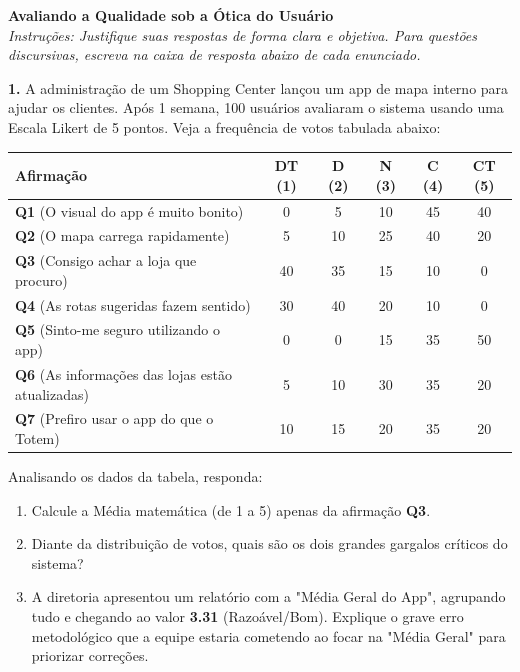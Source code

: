 \documentclass[12pt]{article}
\begin{document}

\vspace*{0.2cm}

\begin{center}
  {\Large \textbf{Avaliando a Qualidade sob a Ótica do Usuário}}\\[0.2cm]
  \textit{Instruções: Justifique suas respostas de forma clara e objetiva.
  Para questões discursivas, escreva na caixa de resposta abaixo de cada enunciado.}
\end{center}

\vspace{0.4cm}

\textbf{1.} A administração de um Shopping Center lançou um app de mapa interno para ajudar os clientes. Após 1 semana, 100 usuários avaliaram o sistema usando uma Escala Likert de 5 pontos. Veja a frequência de votos tabulada abaixo:

\vspace{0.3cm}
\begin{center}
    \renewcommand{\arraystretch}{1.2}
    \begin{tabular}{l | c | c | c | c | c}
        \hline
        \textbf{Afirmação} & \textbf{DT (1)} & \textbf{D (2)} & \textbf{N (3)} & \textbf{C (4)} & \textbf{CT (5)} \\
        \hline
        \textbf{Q1} (O visual do app é muito bonito) & 0 & 5 & 10 & 45 & 40 \\
        \textbf{Q2} (O mapa carrega rapidamente) & 5 & 10 & 25 & 40 & 20 \\
        \textbf{Q3} (Consigo achar a loja que procuro) & 40 & 35 & 15 & 10 & 0 \\
        \textbf{Q4} (As rotas sugeridas fazem sentido) & 30 & 40 & 20 & 10 & 0 \\
        \textbf{Q5} (Sinto-me seguro utilizando o app) & 0 & 0 & 15 & 35 & 50 \\
        \textbf{Q6} (As informações das lojas estão atualizadas) & 5 & 10 & 30 & 35 & 20 \\
        \textbf{Q7} (Prefiro usar o app do que o Totem) & 10 & 15 & 20 & 35 & 20 \\
        \hline
    \end{tabular}
\end{center}
\vspace{0.3cm}

\noindent Analisando os dados da tabela, responda:
\begin{enumerate}[label=\alph*)]
    \item Calcule a Média matemática (de 1 a 5) apenas da afirmação \textbf{Q3}.
    \item Diante da distribuição de votos, quais são os dois grandes gargalos críticos do sistema?
    \item A diretoria apresentou um relatório com a "Média Geral do App", agrupando tudo e chegando ao valor \textbf{3.31} (Razoável/Bom). Explique o grave erro metodológico que a equipe estaria cometendo ao focar na "Média Geral" para priorizar correções.
\end{enumerate}
\end{document}
